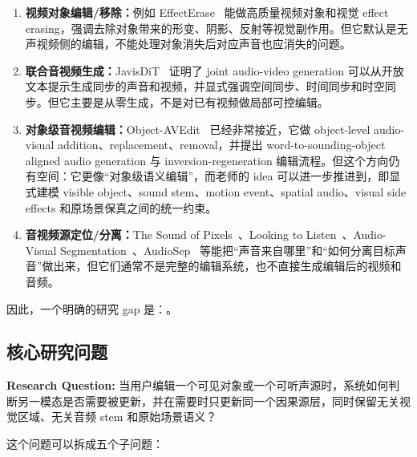 \begin{enumerate}[leftmargin=2em]
  \item \textbf{视频对象编辑/移除：}例如 EffectErase~\cite{effecterase2026} 能做高质量视频对象和视觉 effect erasing，强调去除对象带来的形变、阴影、反射等视觉副作用。但它默认是无声视频侧的编辑，不能处理对象消失后对应声音也应消失的问题。
  \item \textbf{联合音视频生成：}JavisDiT~\cite{javisdit2026} 证明了 joint audio-video generation 可以从开放文本提示生成同步的声音和视频，并显式强调空间同步、时间同步和时空同步。但它主要是从零生成，不是对已有视频做局部可控编辑。
  \item \textbf{对象级音视频编辑：}Object-AVEdit~\cite{objectavedit2026} 已经非常接近，它做 object-level audio-visual addition、replacement、removal，并提出 word-to-sounding-object aligned audio generation 与 inversion-regeneration 编辑流程。但这个方向仍有空间：它更像“对象级语义编辑”，而老师的 idea 可以进一步推进到，即显式建模 visible object、sound stem、motion event、spatial audio、visual side effects 和原场景保真之间的统一约束。
  \item \textbf{音视频源定位/分离：}The Sound of Pixels~\cite{soundofpixels2018}、Looking to Listen~\cite{lookingtolistenn2018}、Audio-Visual Segmentation~\cite{avs2022}、AudioSep~\cite{audiosep2023} 等能把“声音来自哪里”和“如何分离目标声音”做出来，但它们通常不是完整的编辑系统，也不直接生成编辑后的视频和音频。
\end{enumerate}

因此，一个明确的研究 gap 是：。

\subsection{核心研究问题}

\begin{summarybox}
\textbf{Research Question:} 当用户编辑一个可见对象或一个可听声源时，系统如何判断另一模态是否需要被更新，并在需要时只更新同一个因果源层，同时保留无关视觉区域、无关音频 stem 和原始场景语义？
\end{summarybox}

这个问题可以拆成五个子问题：

